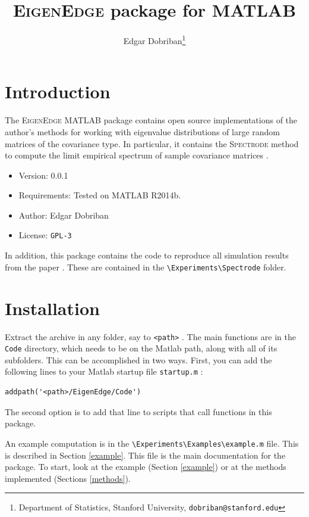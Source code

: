 \documentclass[english,11pt]{article} %
\title{\textsc{EigenEdge} package for MATLAB}
\author{Edgar Dobriban\thanks{Department of Statistics, Stanford University, \texttt{dobriban@stanford.edu}} }
\begin{document}
\maketitle
\tableofcontents
\section{Introduction}

The \textsc{EigenEdge} MATLAB package contains open source implementations of the author's methods for working with eigenvalue distributions of large random matrices of the covariance type. In particular, it contains the \textsc{Spectrode} method to compute the limit empirical spectrum of sample covariance matrices \citep[proposed in][]{dobriban2015efficient}. 

\begin{itemize}
\item{Version: } 0.0.1
\item{Requirements: } Tested on MATLAB R2014b. 
\item{Author: } Edgar Dobriban
\item{License: } \verb+GPL-3+
\end{itemize}

In addition, this package contains the code to reproduce all simulation results from the paper \cite{dobriban2015efficient}. These are contained in the \verb+\Experiments\Spectrode+ folder.

\section{Installation}

Extract the archive in any folder, say to \verb+<path>+ . The main functions are in the \verb+Code+ directory, which needs to be on the Matlab path, along with all of its subfolders. This can be accomplished in two ways. First, you can add the following lines to your Matlab startup file \verb+startup.m+ :

\begin{verbatim}
addpath('<path>/EigenEdge/Code')
\end{verbatim}

The second option is to add that line to scripts that call functions in this package. 

An example computation is in the \verb+\Experiments\Examples\example.m+ file. This is described in Section \ref{example}. This file is the main documentation for the package. To start, look at the example (Section \ref{example}) or at the methods implemented (Sections \ref{methods}).
\end{document}
